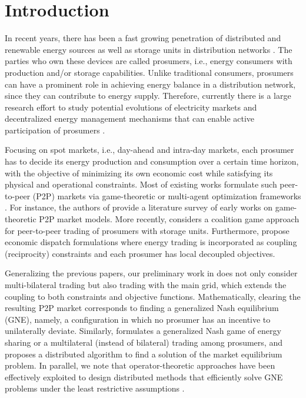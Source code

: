 \documentclass{IEEEtran}  %
\newcommand{\0}{\mathbf{0}}
\newcommand{\1}{\mathbf{1}}
\begin{document}
	\section{Introduction}

In recent years, there has been a fast growing penetration of distributed and renewable energy sources as well as storage units in distribution networks \cite{parag2016}. The parties who own these devices are called prosumers, i.e., energy consumers with production and/or storage capabilities. Unlike traditional consumers, prosumers can have a prominent role in achieving energy balance in a distribution network, since they can contribute to energy supply.  Therefore, currently there is a large research effort to study potential evolutions of electricity markets and decentralized energy management mechanisms that can enable active participation of prosumers \cite{parag2016,tushar2018,liu2019,sousa2019}.

Focusing on spot markets, i.e., day-ahead and intra-day markets, each prosumer has to decide its energy production and consumption over a certain time horizon, with the objective of minimizing its own economic cost while satisfying its physical and operational constraints. 
Most of existing works formulate such peer-to-peer (P2P) markets via game-theoretic or multi-agent optimization frameworks \cite{tushar2018,tushar2020,lecadre2020,cui2020,zhang2020,baroche2019,sorin2019}. For instance, the authors of \cite{tushar2018} provide a literature survey of early works on game-theoretic P2P market models. {More recently, \cite{tushar2020} considers a coalition game approach for peer-to-peer trading of prosumers with storage units.}  Furthermore, \cite{lecadre2020,cui2020,zhang2020,baroche2019,sorin2019} propose economic dispatch formulations where energy trading is incorporated as coupling (reciprocity) constraints and each prosumer has local decoupled objectives. 

Generalizing the previous papers, our preliminary work in  \cite{belgioioso2020energy} does not only consider multi-bilateral trading  but also trading with the main grid, which extends the coupling to both constraints and objective functions. 
%
Mathematically, clearing the resulting P2P market corresponds to finding a generalized Nash equilibrium (GNE), namely, a configuration in which no prosumer has an incentive to unilaterally deviate. 
%
Similarly, \cite{wang2021} formulates a generalized Nash game of energy sharing or a multilateral (instead of bilateral) trading among prosumers, and proposes a distributed algorithm to find a solution of the market equilibrium problem. 
%
In parallel, we note that operator-theoretic approaches have been effectively exploited to design distributed methods that efficiently solve GNE problems under the least restrictive assumptions \cite{paccagnan2019,belgioioso2020b,gadjov2020single,belgioioso2020semi,
	bianchi2020fast}.
\end{document}
